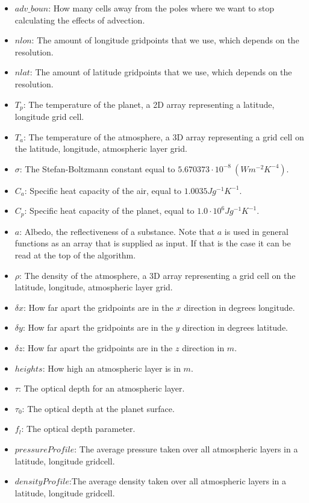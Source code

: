 \begin{itemize}
    \item $adv\_boun$: How many cells away from the poles where we want to stop calculating the effects of advection.
    \item $nlon$: The amount of longitude gridpoints that we use, which depends on the resolution.
    \item $nlat$: The amount of latitude gridpoints that we use, which depends on the resolution.
    \item $T_p$: The temperature of the planet, a 2D array representing a latitude, longitude grid cell.
    \item $T_a$: The temperature of the atmosphere, a 3D array representing a grid cell on the latitude, longitude, atmospheric layer grid.
    \item $\sigma$: The Stefan-Boltzmann constant equal to $5.670373 \cdot 10^{-8} \ (Wm^{-2}K^{-4})$. 
    \item $C_a$: Specific heat capacity of the air, equal to $1.0035 Jg^{-1}K^{-1}$.
    \item $C_p$: Specific heat capacity of the planet, equal to $1.0 \cdot 10^{6} Jg^{-1}K^{-1}$.
    \item $a$: Albedo, the reflectiveness of a substance. Note that $a$ is used in general functions as an array that is supplied as input. If that is the case it can be read at the top of the
                algorithm.
    \item $\rho$: The density of the atmosphere, a 3D array representing a grid cell on the latitude, longitude, atmospheric layer grid.
    \item $\delta x$: How far apart the gridpoints are in the $x$ direction in degrees longitude.
    \item $\delta y$: How far apart the gridpoints are in the $y$ direction in degrees latitude.
    \item $\delta z$: How far apart the gridpoints are in the $z$ direction in $m$.
    \item $heights$: How high an atmospheric layer is in $m$.
    \item $\tau$: The optical depth for an atmospheric layer.
    \item $\tau_0$: The optical depth at the planet surface.
    \item $f_l$: The optical depth parameter.
    \item $pressureProfile$: The average pressure taken over all atmospheric layers in a latitude, longitude gridcell.
    \item $densityProfile$:The average density taken over all atmospheric layers in a latitude, longitude gridcell.

\end{itemize}
